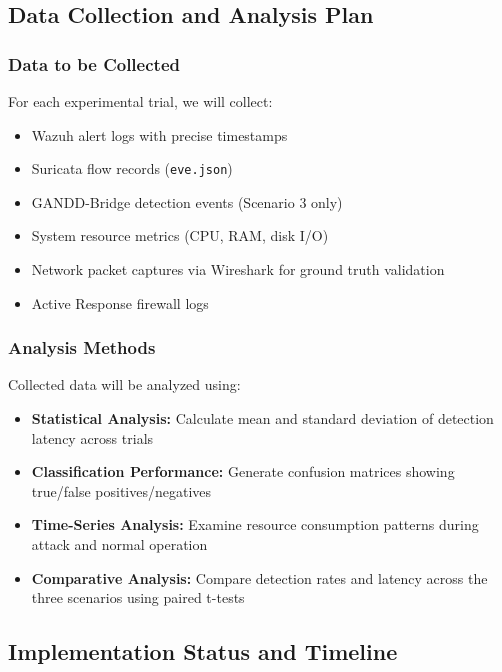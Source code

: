 \label{sec:metrics}

\subsection{Data Collection and Analysis Plan}

\subsubsection{Data to be Collected}

For each experimental trial, we will collect:
\begin{itemize}
    \item Wazuh alert logs with precise timestamps
    \item Suricata flow records (\texttt{eve.json})
    \item GANDD-Bridge detection events (Scenario 3 only)
    \item System resource metrics (CPU, RAM, disk I/O)
    \item Network packet captures via Wireshark for ground truth validation
    \item Active Response firewall logs
\end{itemize}

\subsubsection{Analysis Methods}

Collected data will be analyzed using:
\begin{itemize}
    \item \textbf{Statistical Analysis:} Calculate mean and standard deviation of detection latency across trials
    \item \textbf{Classification Performance:} Generate confusion matrices showing true/false positives/negatives
    \item \textbf{Time-Series Analysis:} Examine resource consumption patterns during attack and normal operation
    \item \textbf{Comparative Analysis:} Compare detection rates and latency across the three scenarios using paired t-tests
\end{itemize}

\subsection{Implementation Status and Timeline}

